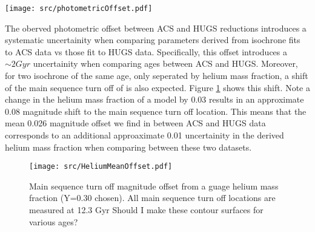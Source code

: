 \begin{figure*}
  \centering
  \texttt{[image: src/photometricOffset.pdf]}
  \caption{(left) CMD showing the photometric offset between the ACS and HUGS data for NGC 2808. CMDs have been randomly subsampled and colored by point density for clarity. (right) Mean difference between the color of the HUGS and ACS fiducual lines at the same magnitude. Note that the ACS data is systematically bluer than the HUGS data.}
  \label{fig:offset}
\end{figure*}

The oberved photometric offset between ACS and HUGS reductions introduces a
systematic uncertainity when comparing parameters derived from isochrone fits
to ACS data vs those fit to HUGS data. Specifically, this offset introduces a
$\sim 2 Gyr$ uncertainity when comparing ages between ACS and HUGS. Moreover,
for two isochrone of the same age, only seperated by helium mass fraction, a
shift of the main sequence turn off of is also expected. Figure \ref{fig:HeMO}
shows this shift. Note a change in the helium mass fraction of a model by 0.03
results in an approximate 0.08 magnitude shift to the main sequence turn off
location. This means that the mean 0.026 magnitude offset we find in between
ACS and HUGS data corresponds to an additional approaximate 0.01 uncertainity
in the derived helium mass fraction when comparing between these two datasets. 

\begin{figure}
  \centering
  \texttt{[image: src/HeliumMeanOffset.pdf]}
  \caption{Main sequence turn off magnitude offset from a guage helium mass fraction (Y=0.30 chosen). All main sequence turn off locations are measured at 12.3 Gyr {\color{blue} Should I make these contour surfaces for various ages?}}
  \label{fig:HeMO}
\end{figure}
